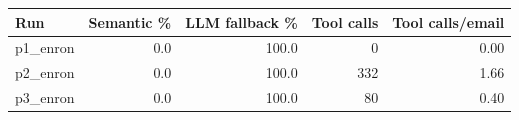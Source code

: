 \begin{tabular}{lrrrr}
\toprule
Run & Semantic \% & LLM fallback \% & Tool calls & Tool calls/email \\
\midrule
p1\_enron & 0.0 & 100.0 & 0 & 0.00 \\
p2\_enron & 0.0 & 100.0 & 332 & 1.66 \\
p3\_enron & 0.0 & 100.0 & 80 & 0.40 \\
\bottomrule
\end{tabular}
